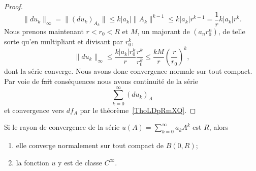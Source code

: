 \begin{proof}
\begin{equation}
        \| du_k \|_{\infty}=\| (du_k)_{A_k} \|\leq k| a_k |\| A_k \|^{k-1}\leq  k| a_k |r^{k-1}=\frac{1}{ r }k| a_k |r^k.
    \end{equation}
    Nous prenons maintenant \( r<r_0<R\) et \( M\), un majorant de \( (a_nr_0^n)\), de telle sorte qu'en multipliant et divisant par \( r_0^k\),
    \begin{equation}
        \| du_k \|_{\infty}\leq \frac{ k| a_k |r_0^k }{ r }\frac{ r^k }{ r_0^k }\leq \frac{ kM }{ r }\left( \frac{ r }{ r_0 } \right)^k,
    \end{equation}
    dont la série converge. Nous avons donc convergence normale sur tout compact. Par voie de \sout{fait} conséquences nous avons continuité de la série
    \begin{equation}
        \sum_{k=0}^{\infty}(du_k)_A
    \end{equation}
    et convergence vers \( df_A\) par le théorème~\ref{ThoLDpRmXQ}.
\end{proof}

\begin{proposition} \label{PropQIIURAh}
    Si le rayon de convergence de la série \( u(A)=\sum_{k=0}^{\infty}a_kA^k\) est \( R\), alors
    \begin{enumerate}
        \item
            elle converge normalement sur tout compact de \( B(0,R)\);
        \item
            la fonction \( u\) y est de classe \(  C^{\infty}\).
    \end{enumerate}
\end{proposition}

